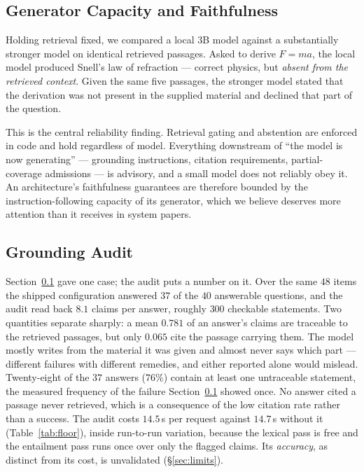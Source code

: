 \documentclass[conference]{IEEEtran}
\begin{document}
\subsection{Generator Capacity and Faithfulness}
\label{sec:faithfulness}
Holding retrieval fixed, we compared a local $3$B model against a substantially
stronger model on identical retrieved passages. Asked to derive $F = ma$, the
local model produced Snell's law of refraction --- correct physics, but
\emph{absent from the retrieved context}. Given the same five passages, the
stronger model stated that the derivation was not present in the supplied
material and declined that part of the question.

This is the central reliability finding. Retrieval gating and abstention are
enforced in code and hold regardless of model. Everything downstream of ``the
model is now generating'' --- grounding instructions, citation requirements,
partial-coverage admissions --- is advisory, and a small model does not reliably
obey it. An architecture's faithfulness guarantees are therefore bounded by the
instruction-following capacity of its generator, which we believe deserves more
attention than it receives in system papers.

\subsection{Grounding Audit}
\label{sec:groundingeval}
Section~\ref{sec:faithfulness} gave one case; the audit puts a number on it.
Over the same $48$ items the shipped configuration answered $37$ of the $40$
answerable questions, and the audit read back $8.1$ claims per answer, roughly
$300$ checkable statements. Two quantities separate sharply: a mean $0.781$ of
an answer's claims are traceable to the retrieved passages, but only $0.065$
cite the passage carrying them. The model mostly writes from the material it was
given and almost never says which part --- different failures with different
remedies, and either reported alone would mislead. Twenty-eight of the $37$
answers ($76\%$) contain at least one untraceable statement, the measured
frequency of the failure Section~\ref{sec:faithfulness} showed once. No answer
cited a passage never retrieved, which is a consequence of the low citation rate
rather than a success. The audit costs $14.5$\,s per request against $14.7$\,s
without it (Table~\ref{tab:floor}), inside run-to-run variation, because the
lexical pass is free and the entailment pass runs once over only the flagged
claims. Its \emph{accuracy}, as distinct from its cost, is unvalidated
(§\ref{sec:limits}).
\end{document}

